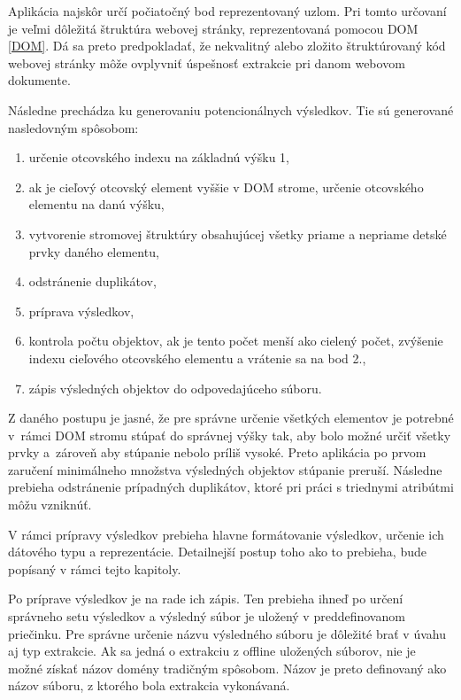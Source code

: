 Aplikácia najskôr určí počiatočný bod reprezentovaný uzlom. Pri tomto určovaní je veľmi dôležitá štruktúra webovej stránky, reprezentovaná pomocou DOM \ref{DOM}. Dá sa preto predpokladať, že nekvalitný alebo zložito štruktúrovaný kód webovej stránky môže ovplyvniť úspešnosť extrakcie pri danom webovom dokumente. 

Následne prechádza ku generovaniu potencionálnych výsledkov. Tie sú generované nasledovným spôsobom:

\bigskip

\begin{enumerate}
    \item určenie otcovského indexu na základnú výšku 1,
    \item ak je cieľový otcovský element vyššie v DOM strome, určenie otcovského elementu na danú výšku,
    \item vytvorenie stromovej štruktúry obsahujúcej všetky priame a nepriame detské prvky daného elementu,
    \item odstránenie duplikátov,
    \item príprava výsledkov,
    \item kontrola počtu objektov, ak je tento počet menší ako cielený počet, zvýšenie indexu cieľového otcovského elementu a vrátenie sa na bod 2.,
    \item zápis výsledných objektov do odpovedajúceho súboru.
\end{enumerate}

\bigskip

Z daného postupu je jasné, že pre správne určenie všetkých elementov je potrebné v~rámci DOM stromu stúpať do správnej výšky tak, aby bolo možné určiť všetky prvky a~zároveň aby stúpanie nebolo príliš vysoké. Preto aplikácia po prvom zaručení minimálneho množstva výsledných objektov stúpanie preruší. Následne prebieha odstránenie prípadných duplikátov, ktoré pri práci s triednymi atribútmi môžu vzniknúť.

V rámci prípravy výsledkov prebieha hlavne formátovanie výsledkov, určenie ich dátového typu a reprezentácie. Detailnejší postup toho ako to prebieha, bude popísaný v rámci tejto kapitoly. 

Po príprave výsledkov je na rade ich zápis. Ten prebieha ihneď po určení správneho setu výsledkov a výsledný súbor je uložený v preddefinovanom priečinku. Pre správne určenie názvu výsledného súboru je dôležité brať v úvahu aj typ extrakcie. Ak sa jedná o extrakciu z offline uložených súborov, nie je možné získať názov domény tradičným spôsobom. Názov je preto definovaný ako názov súboru, z ktorého bola extrakcia vykonávaná. 

